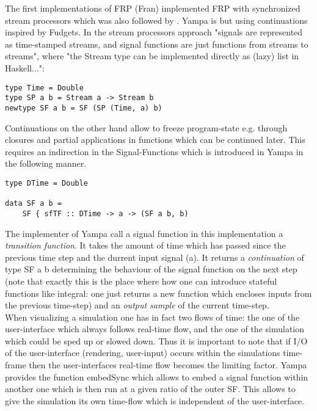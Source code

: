 The first implementations of FRP (Fran) implemented FRP with synchronized stream processors which was also followed by \cite{Wan2000}. Yampa is but using continuations inspired by Fudgets. In the stream processors approach "signals are represented as time-stamped streams, and signal functions are just functions from streams to streams", where "the Stream type can be implemented directly as (lazy) list in Haskell...":
\begin{lstlisting}[frame=single]
type Time = Double
type SP a b = Stream a -> Stream b
newtype SF a b = SF (SP (Time, a) b)
\end{lstlisting}
Continuations on the other hand allow to freeze program-state e.g. through closures and partial applications in functions which can be continued later. This requires an indirection in the Signal-Functions which is introduced in Yampa in the following manner. 
\begin{lstlisting}[frame=single]
type DTime = Double

data SF a b = 
	SF { sfTF :: DTime -> a -> (SF a b, b)
\end{lstlisting}
The implementer of Yampa call a signal function in this implementation a \textit{transition function}. It takes the amount of time which has passed since the previous time step and the durrent input signal (a). It returns a \textit{continuation} of type SF a b determining the behaviour of the signal function on the next step (note that exactly this is the place where how one can introduce stateful functions like integral: one just returns a new function which encloses inputs from the previous time-step) and an \textit{output sample} of the current time-step. \\

When visualizing a simulation one has in fact two flows of time: the one of the user-interface which always follows real-time flow, and the one of the simulation which could be sped up or slowed down. Thus it is important to note that if I/O of the user-interface (rendering, user-input) occurs within the simulations time-frame then the user-interfaces real-time flow becomes the limiting factor. Yampa provides the function embedSync which allows to embed a signal function within another one which is then run at a given ratio of the outer SF. This allows to give the simulation its own time-flow which is independent of the user-interface. \\

